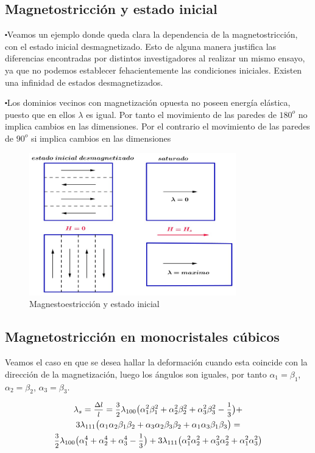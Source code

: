 \subsection{Magnetostricción y estado inicial}

$\centerdot$Veamos un ejemplo donde queda clara la dependencia de la magnetostricción, con el estado inicial desmagnetizado. Esto de alguna manera justifica las diferencias encontradas por distintos investigadores al realizar un mismo ensayo, ya que no podemos establecer fehacientemente las condiciones iniciales. Existen una infinidad de estados desmagnetizados.

$\centerdot$Los dominios vecinos con magnetización opuesta no poseen energía elástica, puesto que en ellos $\lambda$ es igual. Por tanto el movimiento de las paredes de $180^{o}$ no implica cambios en las dimensiones. Por el contrario el movimiento de las paredes de $90^{o}$ si implica cambios en las dimensiones


\begin{figure}[H]
    \centering
    \includegraphics[width=0.8\textwidth]{./Figures/estadoInicial}
	\caption{Magnestoestricción y estado inicial}
	\label{fig:estadoInicial}
\end{figure}

\subsection{Magnetostricción en monocristales cúbicos}

Veamos el caso en que se desea hallar la deformación cuando esta coincide con la dirección de la magnetización, luego los ángulos son iguales, por tanto $\alpha_{1}=\beta_{1}$, $\alpha_{2}=\beta_{2}$, $\alpha_{3}=\beta_{3}$.

\begin{multline}
	\lambda_{s}=\mfrac{\Delta l}{l}=\mfrac{3}{2}\lambda_{100}\big(\alpha_{1}^{2}\beta_{1}^{2}+
	\alpha_{2}^{2}\beta_{2}^{2}+\alpha_{3}^{2}\beta_{3}^{2}-\mfrac{1}{3} \big)+\\
	3\lambda_{111}\big(\alpha_{1}\alpha_{2}\beta_{1}\beta_{2}+
	\alpha_{3}\alpha_{2}\beta_{3}\beta_{2}+\alpha_{1}\alpha_{3}\beta_{1}\beta_{3} \big)= \\
	\mfrac{3}{2}\lambda_{100}\big(\alpha_{1}^{4}+\alpha_{2}^{4}+\alpha_{3}^{4}-\mfrac{1}{3} \big)+
	3\lambda_{111} \big( \alpha_{1}^{2} \alpha_{2}^{2} + \alpha_{3}^{2} \alpha_{2}^{2} + \alpha_{1}^{2}\alpha_{3}^{2} \big)
	\label{eq:magnetoestriccion2}
\end{multline}


